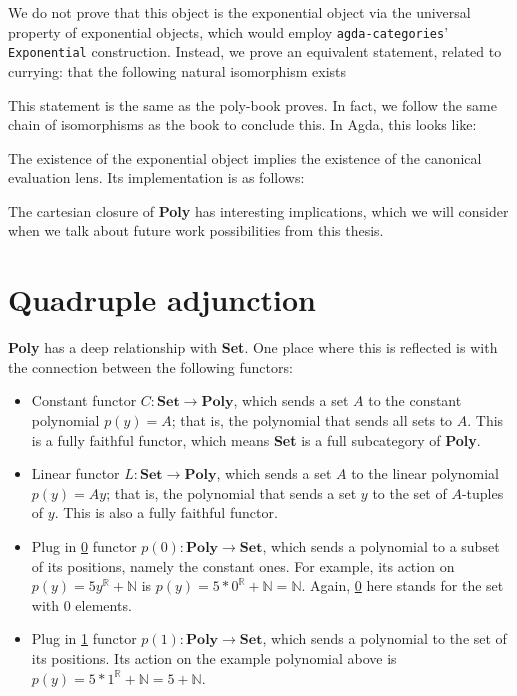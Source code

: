 We do not prove that this object is the exponential object via the universal property of exponential objects, which would employ \texttt{agda-categories}' \texttt{Exponential} construction. Instead, we prove an equivalent statement, related to currying: that the following natural isomorphism exists 
$$
$$

This statement is the same as the poly-book proves. In fact, we follow the same chain of isomorphisms as the book to conclude this. In Agda, this looks like:

The existence of the exponential object implies the existence of the canonical evaluation lens. Its implementation is as follows:


The cartesian closure of \textbf{Poly} has interesting implications, which we will consider when we talk about future work possibilities from this thesis.
\section{Quadruple adjunction}

\textbf{Poly} has a deep relationship with \textbf{Set}. One place where this is reflected is with the connection between the following functors:

\begin{itemize}
    \item Constant functor $C : \textbf{Set} \rightarrow \textbf{Poly}$, which sends a set $A$ to the constant polynomial $p(y) = A$; that is, the polynomial that sends all sets to $A$. This is a fully faithful functor, which means \textbf{Set} is a full subcategory of \textbf{Poly}.
    \item Linear functor $L : \textbf{Set} \rightarrow \textbf{Poly}$,  which sends a set $A$ to the linear polynomial $p(y) = Ay$; that is, the polynomial that sends a set $y$ to the set of $A$-tuples of $y$. This is also a fully faithful functor.
    \item Plug in \underline{0} functor $p(0) : \textbf{Poly} \rightarrow \textbf{Set}$, which sends a polynomial to a subset of its positions, namely the constant ones. For example, its action on $p(y) = 5y^{\mathbb{R}} + \mathbb{N}$ is $p(y) = 5*0^{\mathbb{R}} + \mathbb{N} = \mathbb{N}$. Again, \underline{0} here stands for the set with 0 elements.
    \item Plug in \underline{1} functor $p(1) : \textbf{Poly} \rightarrow \textbf{Set}$, which sends a polynomial to the set of its positions. Its action on the example polynomial above is $p(y) = 5*1^{\mathbb{R}} + \mathbb{N} = 5 + \mathbb{N}$.
\end{itemize}


